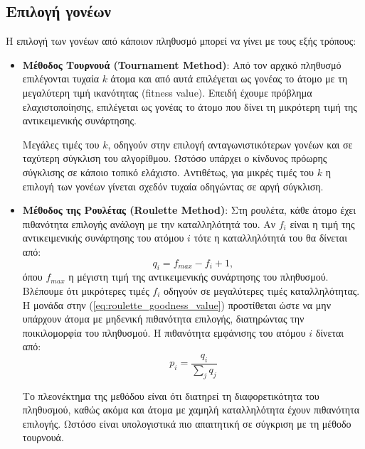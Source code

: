 \documentclass[a4paper,12pt]{article}
\begin{document}
\subsection{Επιλογή γονέων}
Η επιλογή των γονέων από κάποιον πληθυσμό μπορεί να γίνει με τους εξής τρόπους:
\begin{itemize}
    \item \textbf{Μέθοδος Τουρνουά (Tournament Method)}:
    Από τον αρχικό πληθυσμό επιλέγονται τυχαία $k$ άτομα και από αυτά επιλέγεται ως γονέας το άτομο
    με τη μεγαλύτερη τιμή ικανότητας (fitness value).
    Επειδή έχουμε πρόβλημα ελαχιστοποίησης, επιλέγεται ως γονέας το άτομο που δίνει τη μικρότερη τιμή
    της αντικειμενικής συνάρτησης. 
    
    Μεγάλες τιμές του $k$, οδηγούν στην επιλογή ανταγωνιστικότερων γονέων
    και σε ταχύτερη σύγκλιση του αλγορίθμου. Ωστόσο υπάρχει ο κίνδυνος πρόωρης σύγκλισης σε κάποιο τοπικό
    ελάχιστο. Αντιθέτως, για μικρές τιμές του $k$ η επιλογή των γονέων γίνεται σχεδόν τυχαία οδηγώντας σε 
    αργή σύγκλιση.

    \item \textbf{Μέθοδος της Ρουλέτας (Roulette Method)}:
    Στη ρουλέτα, κάθε άτομο έχει πιθανότητα επιλογής ανάλογη με την καταλληλότητά του. Αν $f_i$ είναι η
    τιμή της αντικειμενικής συνάρτησης του ατόμου $i$ τότε η καταλληλότητά του θα δίνεται από:
    \begin{equation}
        q_i = f_{max} - f_i + 1,
        \label{eq:roulette_goodness_value}
    \end{equation}
    όπου $f_{max}$ η μέγιστη τιμή της αντικειμενικής συνάρτησης του πληθυσμού. Βλέπουμε ότι μικρότερες τιμές
    $f_i$ οδηγούν σε μεγαλύτερες τιμές καταλληλότητας. Η μονάδα στην (\ref{eq:roulette_goodness_value}) προστίθεται
    ώστε να μην υπάρχουν άτομα με μηδενική πιθανότητα επιλογής, διατηρώντας την ποικιλομορφία του πληθυσμού.
    Η πιθανότητα εμφάνισης του ατόμου $i$ δίνεται από:
    \begin{equation}
        p_i = \frac{q_i}{\sum_{j}q_j}
        \label{eq:roulette_selection_probability}
    \end{equation}

    Το πλεονέκτημα της μεθόδου είναι ότι διατηρεί τη διαφορετικότητα του πληθυσμού, καθώς ακόμα και άτομα με χαμηλή 
    καταλληλότητα έχουν πιθανότητα επιλογής. Ωστόσο είναι υπολογιστικά πιο απαιτητική σε σύγκριση με τη μέθοδο τουρνουά.


\end{itemize}
\end{document}
